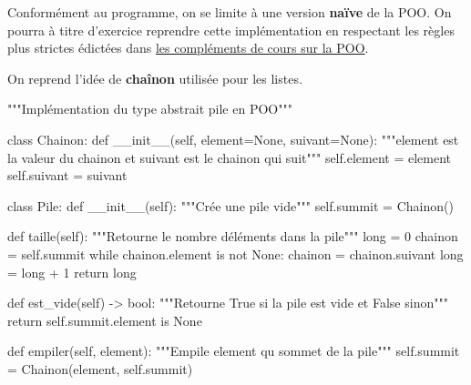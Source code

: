 \documentclass[
  a4paper,
  DIV=11,
  numbers=noendperiod]{scrartcl}
\newenvironment{Shaded}{\begin{snugshade}}{\end{snugshade}}
\newcommand{\BuiltInTok}[1]{\textcolor[rgb]{0.00,0.23,0.31}{#1}}
\newcommand{\CommentTok}[1]{\textcolor[rgb]{0.37,0.37,0.37}{#1}}
\newcommand{\ControlFlowTok}[1]{\textcolor[rgb]{0.00,0.23,0.31}{#1}}
\newcommand{\DecValTok}[1]{\textcolor[rgb]{0.68,0.00,0.00}{#1}}
\newcommand{\FunctionTok}[1]{\textcolor[rgb]{0.28,0.35,0.67}{#1}}
\newcommand{\KeywordTok}[1]{\textcolor[rgb]{0.00,0.23,0.31}{#1}}
\newcommand{\NormalTok}[1]{\textcolor[rgb]{0.00,0.23,0.31}{#1}}
\newcommand{\OperatorTok}[1]{\textcolor[rgb]{0.37,0.37,0.37}{#1}}
\newcommand{\VariableTok}[1]{\textcolor[rgb]{0.07,0.07,0.07}{#1}}
\begin{document}
Conformément au programme, on se limite à une version \textbf{naïve} de
la POO. On pourra à titre d'exercice reprendre cette implémentation en
respectant les règles plus strictes édictées dans
\href{../langagesProgr/POO_complements.qmd}{les compléments de cours sur
la POO}.

On reprend l'idée de \textbf{chaînon} utilisée pour les listes.

\begin{Shaded}
\begin{Highlighting}[]
\CommentTok{"""Implémentation du type abstrait pile en POO"""}


\KeywordTok{class}\NormalTok{ Chainon:}
    \KeywordTok{def} \FunctionTok{\_\_init\_\_}\NormalTok{(}\VariableTok{self}\NormalTok{, element}\OperatorTok{=}\VariableTok{None}\NormalTok{, suivant}\OperatorTok{=}\VariableTok{None}\NormalTok{):}
        \CommentTok{"""element est la valeur du chainon et suivant est le chainon qui suit"""}
        \VariableTok{self}\NormalTok{.element }\OperatorTok{=}\NormalTok{ element}
        \VariableTok{self}\NormalTok{.suivant }\OperatorTok{=}\NormalTok{ suivant}


\KeywordTok{class}\NormalTok{ Pile:}
    \KeywordTok{def} \FunctionTok{\_\_init\_\_}\NormalTok{(}\VariableTok{self}\NormalTok{):}
        \CommentTok{"""Crée une pile vide"""}
        \VariableTok{self}\NormalTok{.summit }\OperatorTok{=}\NormalTok{ Chainon()}

    \KeywordTok{def}\NormalTok{ taille(}\VariableTok{self}\NormalTok{):}
        \CommentTok{"""Retourne le nombre d\textquotesingle{}éléments dans la pile"""}
        \BuiltInTok{long} \OperatorTok{=} \DecValTok{0}
\NormalTok{        chainon }\OperatorTok{=} \VariableTok{self}\NormalTok{.summit}
        \ControlFlowTok{while}\NormalTok{ chainon.element }\KeywordTok{is} \KeywordTok{not} \VariableTok{None}\NormalTok{:}
\NormalTok{            chainon }\OperatorTok{=}\NormalTok{ chainon.suivant}
            \BuiltInTok{long} \OperatorTok{=} \BuiltInTok{long} \OperatorTok{+} \DecValTok{1}
        \ControlFlowTok{return} \BuiltInTok{long}

    \KeywordTok{def}\NormalTok{ est\_vide(}\VariableTok{self}\NormalTok{) }\OperatorTok{{-}\textgreater{}} \BuiltInTok{bool}\NormalTok{:}
        \CommentTok{"""Retourne True si la pile est vide et False sinon"""}
        \ControlFlowTok{return} \VariableTok{self}\NormalTok{.summit.element }\KeywordTok{is} \VariableTok{None}

    \KeywordTok{def}\NormalTok{ empiler(}\VariableTok{self}\NormalTok{, element):}
        \CommentTok{"""Empile element qu sommet de la pile"""}
        \VariableTok{self}\NormalTok{.summit }\OperatorTok{=}\NormalTok{ Chainon(element, }\VariableTok{self}\NormalTok{.summit)}


\end{Highlighting}
\end{Shaded}
\end{document}
